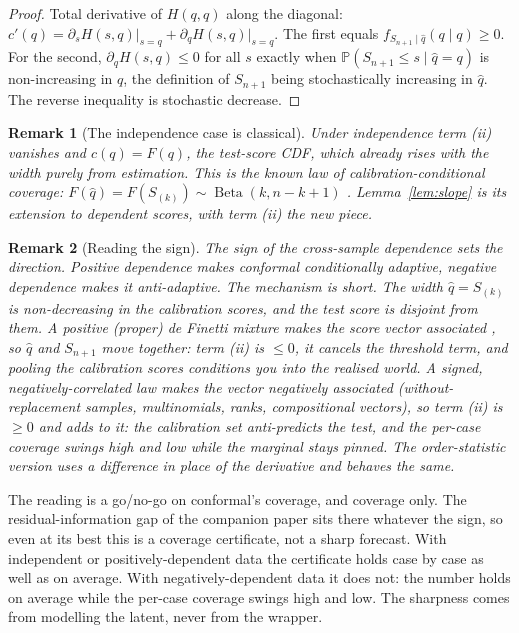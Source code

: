 \documentclass[11pt]{article}
\newtheorem{remark}{Remark}
\begin{document}
\begin{proof}
Total derivative of $H(q,q)$ along the diagonal: $c'(q)=\partial_s H(s,q)\big|_{s=q}+\partial_q
H(s,q)\big|_{s=q}$. The first equals $f_{S_{n+1}\mid\hat q}(q\mid q)\ge 0$. For the second,
$\partial_q H(s,q)\le 0$ for all $s$ exactly when $\mathbb P(S_{n+1}\le s\mid\hat q=q)$ is
non-increasing in $q$, the definition of $S_{n+1}$ being stochastically increasing in
$\hat q$. The reverse inequality is stochastic decrease.
\end{proof}

\begin{remark}[The independence case is classical]
Under independence term (ii) vanishes and $c(q)=F(q)$, the test-score CDF, which already rises
with the width purely from estimation. This is the known law of calibration-conditional
coverage: $F(\hat q)=F(S_{(k)})\sim\operatorname{Beta}(k,n-k+1)$
\citep{vovk2012,marques2024,angelopoulos2023gentle}. Lemma~\ref{lem:slope} is its extension to
dependent scores, with term (ii) the new piece.
\end{remark}

\begin{remark}[Reading the sign]
The sign of the cross-sample dependence sets the direction. Positive dependence makes conformal
conditionally adaptive, negative dependence makes it anti-adaptive. The mechanism is short. The
width $\hat q=S_{(k)}$ is non-decreasing in the calibration scores, and the test score is
disjoint from them. A positive (proper) de Finetti mixture makes the score vector associated
\citep{esary1967}, so $\hat q$ and $S_{n+1}$ move together: term (ii) is $\le 0$, it cancels the
threshold term, and pooling the calibration scores conditions you into the realised world. A
signed, negatively-correlated law makes the vector negatively associated \citep{joagdev1983}
(without-replacement samples, multinomials, ranks, compositional vectors), so term (ii) is
$\ge 0$ and adds to it: the calibration set anti-predicts the test, and the per-case coverage
swings high and low while the marginal stays pinned. The order-statistic version uses a
difference in place of the derivative and behaves the same.
\end{remark}

The reading is a go/no-go on conformal's coverage, and coverage only. The residual-information
gap of the companion paper sits there whatever the sign, so even at its best this is a coverage
certificate, not a sharp forecast. With independent or positively-dependent data the certificate
holds case by case as well as on average. With negatively-dependent data it does not: the number holds on
average while the per-case coverage swings high and low. The sharpness comes from modelling the
latent, never from the wrapper.
\end{document}
